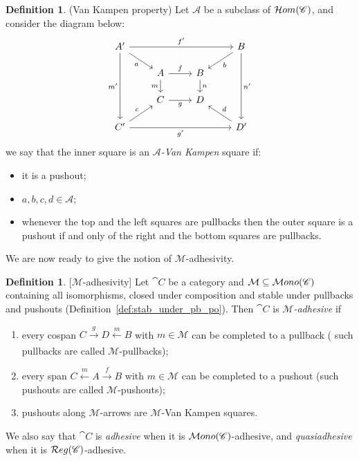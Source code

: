 \documentclass[a4paper, twoside,openright]{report}
\theoremstyle{plain}
\theoremstyle{definition}
\newtheorem{definition}[theorem]{Definition}
\begin{document}
\begin{definition}(Van Kampen property)
    Let $\mathcal A$ be a subclass of $\mathcal{H}om(\mathscr{C})$, and consider the diagram below:
    \[
    \begin{tikzcd}[row sep = scriptsize]
        A' \arrow[ddd, "m'"swap] \arrow[rrr, "f'"] \arrow[dr, "a"swap] & & & B \arrow[ddd, "n'"] \arrow[dl, "b"] \\
        & A \arrow[r, "f"] \arrow[d, "m" swap] & B \arrow[d, "n"]   & \\
        & C \arrow[r, "g" swap]                & D                  & \\
        C' \arrow[rrr, "g'"swap] \arrow[ur, "c"] & & & D' \arrow[ul, "d" swap] 
    \end{tikzcd}
    \]
    we say that the inner square is an \emph{$\mathcal A$-Van Kampen} square if:
    \begin{itemize}
        \item it is a pushout;
        \item $a, b, c, d \in \mathcal{A}$;
        \item whenever the top and the left squares are pullbacks then the outer square is a pushout if and only of the right and the bottom squares are pullbacks.
    \end{itemize}
\end{definition}

We are now ready to give the notion of $\mathcal M$-adhesivity. %

\begin{definition}\label{def:adh}[$\mathcal{M}$-adhesivity]
    Let $\cat C$ be a category and $\mathcal M \subseteq \mathcal{M}ono(\mathscr{C})$ containing all isomorphisms, closed under composition and stable under pullbacks and pushouts (Definition~\ref{def:stab_under_pb_po}).
    Then $\cat C$ is \emph{$\mathcal M$-adhesive} if
    \begin{enumerate}
        \item every cospan $C \xrightarrow[]{g} D \xleftarrow[]{m} B$ with $m \in \mathcal M$ can be completed to a pullback ( such pullbacks are called $\mathcal M$-pullbacks);
        \item every span $C \xleftarrow{m} A \xrightarrow{f} B$ with $ m \in \mathcal M$ can be completed to a pushout (such pushouts are called $\mathcal M$-pushouts);
        \item pushouts along $\mathcal M$-arrows are $\mathcal M$-Van Kampen squares.
    \end{enumerate}
    We also say that $\cat C$ is \emph{adhesive} when it is $\mathcal{M}ono(\mathscr{C})$-adhesive, and \emph{quasiadhesive} when it is $\mathcal{R}eg(\mathscr{C})$-adhesive.
\end{definition}
\end{document}
